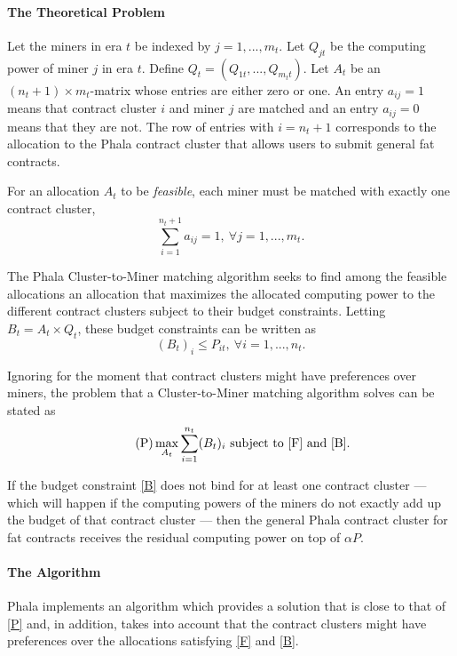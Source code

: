 \documentclass[11pt, a4paper, twocolumn]{article}
\begin{document}
\paragraph{The Theoretical Problem} Let the miners in era $t$ be indexed by $j = 1,...,m_t$. Let $Q_{jt}$ be the computing power of miner $j$ in era $t$. Define $Q_t = (Q_{1t},...,Q_{m_tt})$. Let $A_t$ be an $(n_t + 1)\times m_t$-matrix whose entries are either zero or one. An entry $a_{ij}=1$ means that contract cluster $i$ and miner $j$ are matched and an entry $a_{ij}=0$ means that they are not. The row of entries with $i = n_t+1$ corresponds to the allocation to the Phala contract cluster that allows users to submit general fat contracts.

For an allocation $A_t$ to be \textit{feasible}, each miner must be matched with exactly one contract cluster, 
%
\begin{equation}\tag{F}\label{F}\sum_{i=1}^{n_t+1} a_{ij}  = 1, \ \forall j = 1,..., m_t.\end{equation}

The Phala Cluster-to-Miner matching algorithm seeks to find among the feasible allocations an allocation that maximizes the allocated computing power to the different contract clusters subject to their budget constraints. Letting $B_t = A_t\times Q_t$, these budget constraints can be written as 
%
\begin{equation}\tag{B}\label{B}
(B_t)_i \leq P_{it}, \ \forall i = 1,...,n_t.
\end{equation}

Ignoring for the moment that contract clusters might have preferences over miners, the problem that a Cluster-to-Miner matching algorithm solves can be stated as
%
\begin{equation}\label{P}\tag{P}
\max_{A_t} \sum_{i=1}^{n_t} (B_t)_i \text{ subject to } \eqref{F} \text{ and } \eqref{B}.
\end{equation}

If the budget constraint \eqref{B} does not bind for at least one contract cluster --- which will happen if the computing powers of the miners do not exactly add up the budget of that contract cluster --- then the general Phala contract cluster for fat contracts receives the residual computing power on top of $\alpha P$. 

\paragraph{The Algorithm} Phala implements an algorithm which provides a solution that is close to that of \eqref{P} and, in addition, takes into account that the contract clusters might have preferences over the allocations satisfying \eqref{F} and \eqref{B}. 
\end{document}
